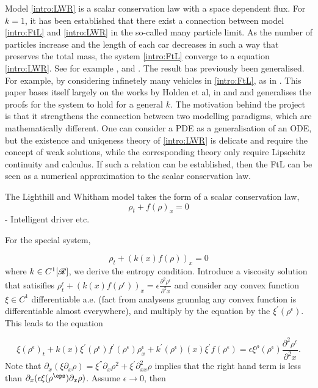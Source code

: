 Model \eqref{intro:LWR} is a scalar conservation law with a space dependent flux. For $k = 1$, it has been established that there exist a connection between model \eqref{intro:FtL} and \eqref{intro:LWR} in the so-called many particle limit. As the number of particles increase and the length of each car decreases in such a way that preserves the total mass, the system \eqref{intro:FtL} converge to a equation \eqref{intro:LWR}. See for example \cite{di2015rigorous},  \cite{holden2017continuum} and \cite{1556-1801_2018_3_409}. The result has previously been generalised. For example, by considering infinetely many vehicles in \eqref{intro:FtL}, as in  \cite{MARCELLINI2021124664}. This paper bases itself largely on the works by Holden et al, in \cite{556-1801_2018_3_409} and \cite{holden2017continuum} and generalises the proofs for the system to hold for a general $k$. The motivation behind the project is that it strengthens the connection between two modelling paradigms, which are mathematically different. One can consider a PDE as a generalisation of an ODE, but the existence and uniqeness theory of \eqref{intro:LWR} is delicate and require the concept of weak solutions, while the corresponding theory only require Lipschitz continuity and calculus. If such a relation can be established, then the FtL can be seen as a numerical approximation to the scalar conservation law. 


\iffalse

\textcite{argall2002rigorous}

The Lighthill and Whitham model takes the form of a scalar conservation law,
\begin{equation}
    \rho_t + f(\rho)_x = 0
\end{equation}
- Intelligent driver etc. 

For the special system, 

\begin{equation} \label{special inhom SCL}
    \rho_t + (k(x)f(\rho))_x = 0
\end{equation}
where $k \in C^1[\mathscr{R}]$, we derive the entropy condition. Introduce a viscosity solution that satisifies $\rho^{\epsilon}_t + (k(x)f(\rho^{\epsilon}))_x = \epsilon  \frac{\partial^2 \rho^\epsilon}{\partial^2x} $ and consider any convex function $\xi \in C^1$ differentiable a.e. (fact from analysens grunnlag any convex function is differentiable almost everywhere), and multiply by the equation by the $\xi^{'}(\rho^{\epsilon})$. This leads to the equation 

\begin{equation}
    \xi(\rho^{\epsilon})_t + k(x) \xi^{'}(\rho^{\epsilon}) f^{'}(\rho^{\epsilon})\rho^{\epsilon}_x + k^{'}(\rho^{\epsilon})(x)\xi^{'}f(\rho^{\epsilon}) = \epsilon \xi^{\rho}(\rho^{\epsilon}) \frac{\partial^2 \rho^\epsilon}{\partial^2x}. 
\end{equation}
Note that $\partial_x(\xi \partial_x \rho) = \xi^{''} \partial_x \rho^2 + \xi^{'}\partial^2_{xx}\rho$ implies that the right hand term is less than $\partial_x(\epsilon \xi(\rho^{\eps}) \partial_x \rho)$. Assume $\epsilon \to 0$, then 

